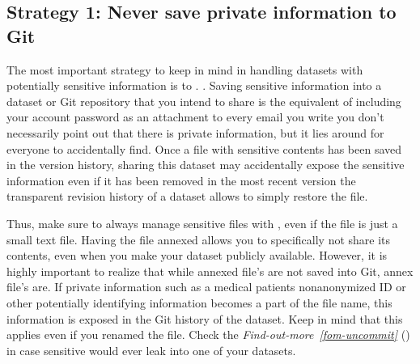 \subsection{Strategy 1: Never save private information to Git}
\label{\detokenize{basics/101-139-privacy:strategy-1-never-save-private-information-to-git}}
\sphinxAtStartPar
The most important strategy to keep in mind in handling datasets with potentially sensitive information is to . .
Saving sensitive information into a dataset or Git repository that you intend to share is the equivalent of including your account password as an attachment to every email you write \textendash{} you don’t necessarily point out that there is private information, but it lies around for everyone to accidentally find.
Once a file with sensitive contents has been saved in the version history, sharing this dataset may accidentally expose the sensitive information even if it has been removed in the most recent version \textendash{} the transparent revision history of a dataset allows to simply restore the file.

\sphinxAtStartPar
Thus, make sure to always manage sensitive files with {\hyperref[\detokenize{glossary:term-git-annex}]{}}, even if the file is just a small text file.
Having the file annexed allows you to specifically not share its contents, even when you make your dataset publicly available.
However, it is highly important to realize that while annexed file’s  are not saved into Git, annex file’s  are.
If private information such as a medical patients non\sphinxhyphen{}anonymized ID or other potentially identifying information becomes a part of the file name, this information is exposed in the Git history of the dataset.
Keep in mind that this applies even if you renamed the file.
Check the \textit{Find-out-more}~{\findoutmoreiconinline}\textit{\ref{fom-uncommit}} {\hyperref[\detokenize{basics/101-139-privacy:fom-uncommit}]{}} () in case sensitive would ever leak into one of your datasets.

